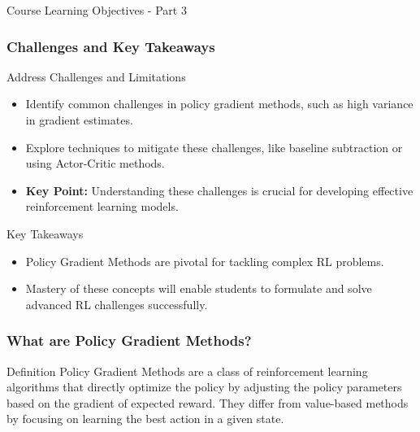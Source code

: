 \documentclass[aspectratio=169]{beamer}
\begin{document}
\begin{frame}[fragile]{Course Learning Objectives - Part 3}
    \frametitle{Challenges and Key Takeaways}
    
    \begin{block}{Address Challenges and Limitations}
        \begin{itemize}
            \item Identify common challenges in policy gradient methods, such as high variance in gradient estimates.
            \item Explore techniques to mitigate these challenges, like baseline subtraction or using Actor-Critic methods.
            \item \textbf{Key Point:} Understanding these challenges is crucial for developing effective reinforcement learning models.
        \end{itemize}
    \end{block}
    
    \begin{block}{Key Takeaways}
        \begin{itemize}
            \item Policy Gradient Methods are pivotal for tackling complex RL problems.
            \item Mastery of these concepts will enable students to formulate and solve advanced RL challenges successfully.
        \end{itemize}
    \end{block}

\end{frame}

\begin{frame}[fragile]
    \frametitle{What are Policy Gradient Methods?}
    \begin{block}{Definition}
        Policy Gradient Methods are a class of reinforcement learning algorithms 
        that directly optimize the policy by adjusting the policy parameters based 
        on the gradient of expected reward. They differ from value-based methods by 
        focusing on learning the best action in a given state.
    \end{block}
\end{frame}
\end{document}

